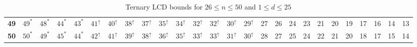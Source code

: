 \begin{sidewaystable}
\begin{tabular}{|c| c c c c c c c c c c c c c c c c c c c c c c c c c |}
\textbf{49} & $49^*$ & $48^*$ & $44^*$ & $43^*$ & $41^\uparrow$ & $40^\uparrow$ & $38^\uparrow$ & $37^\uparrow$ & $35^\uparrow$ & $34^\uparrow$ & $32^\uparrow$ & $32^\uparrow$ & $30^\uparrow$ & $29^\uparrow$ & 27 & 26 & 24 & 23 & 21 & 20 & 19 & 17 & 16 & 14 & 13 \\
\textbf{50} & $50^*$ & $49^*$ & $45^*$ & $44^*$ & $42^\uparrow$ & $41^\uparrow$ & $39^\uparrow$ & $38^\uparrow$ & $36^\uparrow$ & $35^\uparrow$ & $33^\uparrow$ & $33^\uparrow$ & $31^\uparrow$ & $30^\uparrow$ & 28 & 27 & 25 & 24 & 22 & 21 & 20 & 18 & 17 & 15 & 14 \\
\hline
\end{tabular}
\caption{Ternary LCD bounds for $26 \leq n \leq 50$ and $1 \leq d \leq 25$}
\label{tab:lp_tables_q3_26_50_1_25}
\end{sidewaystable}